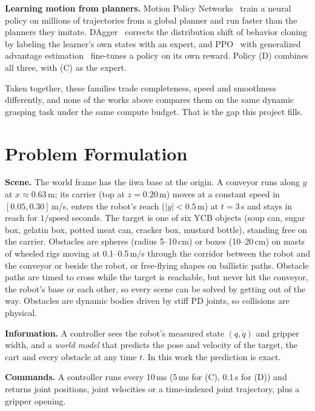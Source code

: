 \documentclass[conference]{IEEEtran}
\begin{document}
\textbf{Learning motion from planners.} Motion Policy Networks~\cite{fishman2022mpinets} train a neural
policy on millions of trajectories from a global planner and run faster than the planners they imitate.
DAgger~\cite{ross2011dagger} corrects the distribution shift of behavior cloning by labeling the
learner's own states with an expert, and PPO~\cite{schulman2017ppo} with generalized advantage
estimation~\cite{schulman2016gae} fine-tunes a policy on its own reward. Policy (D) combines all three,
with (C) as the expert.

Taken together, these families trade completeness, speed and smoothness differently, and none of the
works above compares them on the same dynamic grasping task under the same compute budget. That is the
gap this project fills.

\section{Problem Formulation}
\label{sec:problem}

\textbf{Scene.} The world frame has the iiwa base at the origin. A conveyor runs along $y$ at
$x\approx0.63$\,m; its carrier (top at $z=0.20$\,m) moves at a constant speed in $[0.05, 0.30]$\,m/s,
enters the robot's reach ($|y|<0.5$\,m) at $t=3$\,s and stays in reach for $1/\text{speed}$ seconds.
The target is one of six YCB objects (soup can, sugar box, gelatin box, potted meat can, cracker box,
mustard bottle), standing free on the carrier. Obstacles are spheres (radius 5--10\,cm) or boxes
(10--20\,cm) on masts of wheeled rigs moving at 0.1--0.5\,m/s through the corridor between the robot
and the conveyor or beside the robot, or free-flying shapes on ballistic paths. Obstacle paths are timed
to cross while the target is reachable, but never hit the conveyor, the robot's base or each other, so
every scene can be solved by getting out of the way. Obstacles are dynamic bodies driven by stiff
PD joints, so collisions are physical.

\textbf{Information.} A controller sees the robot's measured state $(q, \dot q)$ and gripper width,
and a \emph{world model} that predicts the pose and velocity of the target, the cart and every
obstacle at any time $t$. In this work the prediction is exact.

\textbf{Commands.} A controller runs every 10\,ms (5\,ms for (C), 0.1\,s for (D)) and returns joint positions,
joint velocities or a time-indexed joint trajectory, plus a gripper opening.
\end{document}
